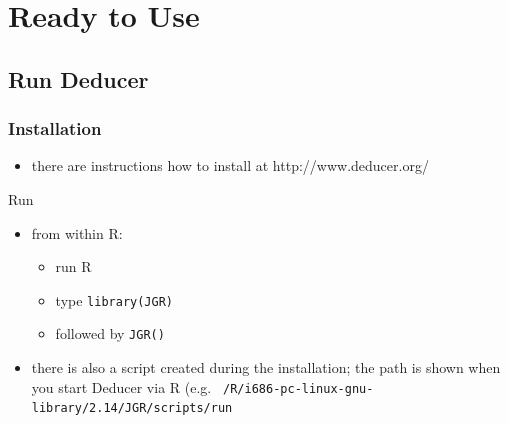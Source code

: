 \documentclass[xcolor={table}]{beamer}
\begin{document}
\section{Ready to Use}
\subsection{Run Deducer}

\begin{frame}\frametitle{Installation}
\begin{itemize}
\item there are instructions how to install at http://www.deducer.org/
\end{itemize}
\end{frame}



\begin{frame}{Run}
  \begin{itemize}
    \item from within R:
      \begin{itemize}
        \item run R
        \item type \texttt{library(JGR)}
        \item followed by \texttt{JGR()}
      \end{itemize}
    \item there is also a script created during the installation; the path is shown when you start Deducer via R (e.g. \texttt{~/R/i686-pc-linux-gnu-library/2.14/JGR/scripts/run}
  \end{itemize}
\end{frame}
\end{document}
